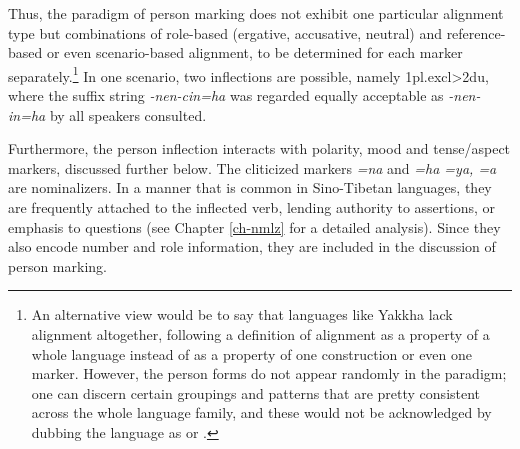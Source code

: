 Thus, the paradigm of person marking does not exhibit one particular alignment type but combinations of role-based (ergative, accusative, neutral) and reference-based or even scenario-based alignment, to be determined for each marker separately.\footnote{An alternative view would be to say that languages like Yakkha lack alignment altogether, following a definition of alignment as a property of a whole language instead of as a property of one construction or even one marker. However, the person forms do not appear randomly in the paradigm; one can discern certain groupings and patterns that are pretty consistent across the whole language family, and these would not be acknowledged by dubbing the language as  or .} In one scenario, two inflections are possible, namely {\sc 1pl.excl>2du}, where the suffix string \emph{-nen-cin=ha} was regarded equally acceptable as \emph{-nen-in=ha} by all speakers consulted. 
 
 Furthermore, the person inflection interacts with polarity, mood and tense/aspect markers, discussed further below. The cliticized markers  \emph{=na} and \emph{=ha \ti =ya, \ti =a} are nominalizers. In a manner that is common in Sino-Tibetan languages, they are frequently attached to the inflected verb, lending authority to assertions, or emphasis to questions (see Chapter \ref{ch-nmlz} for a detailed analysis). Since they also encode number and role information, they are included in the discussion of person marking. 

